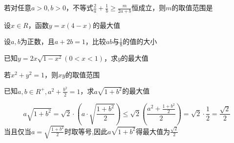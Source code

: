 \par
\begin{problem}
    若对任意$a>0,b>0$，不等式$\displaystyle \frac{2}{a}+\frac{1}{b} \ge \frac{m}{2a+b}$恒成立，则$m$的取值范围是\tiankong{$(-\infty,9]$}
\end{problem}

\par
\begin{problem}
    设$x\in R$，函数$y=x(4-x)$的最大值
\end{problem}

\par
\begin{problem}
    设$a,b$为正数，且$a+2b=1$，比较$ab$与$\displaystyle \frac{1}{8}$的值的大小
\end{problem}

\par
\begin{problem}
    已知$y=2x\sqrt{1-x^2}(0<x<1)$，求$y$的最大值
\end{problem}

\par
\begin{problem}
    若$x^2+y^2=1$，则$xy$的取值范围
\end{problem}

\par
\begin{problem}
    已知$\displaystyle a,b \in R^+,a^2+\frac{b^2}{2} = 1$，求$a\sqrt{1+b^2}$的最大值
    \begin{jiexi}
        $$\displaystyle a\sqrt{1+b^2}=\sqrt{2}\cdot(a\cdot \sqrt{\frac{1+b^2}{2}}) \le \sqrt{2}(\frac{a^2+\frac{1+b^2}{2}}{2}) = \sqrt{2}\cdot\frac{1}{2}=\frac{\sqrt{2}}{2}$$
        当且仅当$\displaystyle a=\sqrt{\frac{1+b^2}{2}}$时取等号,因此$a\sqrt{1+b^2}$得最大值为$\displaystyle \frac{\sqrt{2}}{2}$
    \end{jiexi}
\end{problem}

